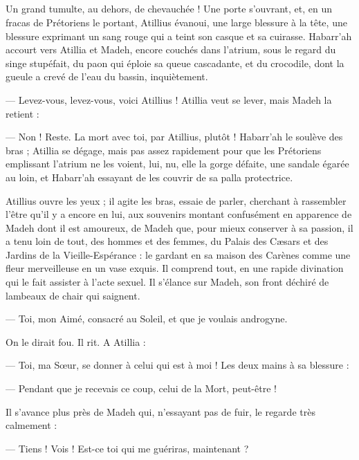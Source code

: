 \documentclass[a4paper, 11pt, oneside, polutonikogreek, french]{article}
\begin{document}
\subsection{}
\paragraph{}
Un grand tumulte, au dehors, de chevauchée ! Une porte s'ouvrant, et, en un fracas de Prétoriens le portant, Atillius évanoui, une large blessure à la tête, une blessure exprimant un sang rouge qui a teint son casque et sa cuirasse. Habarr'ah accourt vers Atillia et Madeh, encore couchés dans l'atrium, sous le regard du singe stupéfait, du paon qui éploie sa queue cascadante, et du crocodile, dont la gueule a crevé de l'eau du bassin, inquiètement.

--- Levez-vous, levez-vous, voici Atillius ! Atillia veut se lever, mais Madeh la retient :

--- Non ! Reste. La mort avec toi, par Atillius, plutôt ! Habarr'ah le soulève des bras ; Atillia se dégage, mais pas assez rapidement pour que les Prétoriens emplissant l'atrium ne les voient, lui, nu, elle la gorge défaite, une sandale égarée au loin, et Habarr'ah essayant de les couvrir de sa palla protectrice.

Atillius ouvre les yeux ; il agite les bras, essaie de parler, cherchant à rassembler l'être qu'il y a encore en lui, aux souvenirs montant confusément en apparence de Madeh dont il est amoureux, de Madeh que, pour mieux conserver à sa passion, il a tenu loin de tout, des hommes et des femmes, du Palais des Cæsars et des Jardins de la Vieille-Espérance : le gardant en sa maison des Carènes comme une fleur merveilleuse en un vase exquis. Il comprend tout, en une rapide divination qui le fait assister à l'acte sexuel. Il s'élance sur Madeh, son front déchiré de lambeaux de chair qui saignent.

--- Toi, mon Aimé, consacré au Soleil, et que je voulais androgyne.

On le dirait fou. Il rit. A Atillia :

--- Toi, ma Sœur, se donner à celui qui est à moi ! Les deux mains à sa blessure :

--- Pendant que je recevais ce coup, celui de la Mort, peut-être !

Il s'avance plus près de Madeh qui, n'essayant pas de fuir, le regarde très calmement :

--- Tiens ! Vois ! Est-ce toi qui me guériras, maintenant ?
\end{document}
